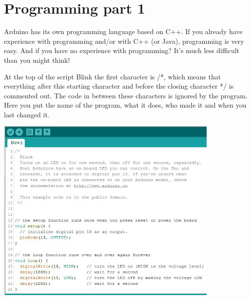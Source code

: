 \documentclass{arduino}
\begin{document}
\newlength{\biggraphicwithtext}
\setlength{\biggraphicwithtext}{\dimexpr(\textwidth+65mm)\relax}
\setlength{\textwidthnexttobiggraphic}{\dimexpr(\biggraphicwithtext-120mm)\relax}
\begin{minipage}{\biggraphicwithtext}
\begin{minipage}{\textwidthnexttobiggraphic}
\section{Programming part 1}\vspace{\baselineskip}

Arduino has its own programming language based on C++. If you already have experience with programming and/or with C++ (or Java), programming is very easy. And if you have no experience with programming? It's much less difficult than you might think! \vspace{\baselineskip}

At the top of the script Blink the first character is /*, which means that everything after this starting character and before the closing character */ is commented out. The code in between these characters is ignored by the program. Here you put the name of the program, what it does, who made it and when you last changed it.
\end{minipage}\hfill\begin{minipage}{12cm}
\raggedleft
\includegraphics[width=11cm]{12. Arduino code}
\end{minipage}
\end{minipage}
\end{document}
